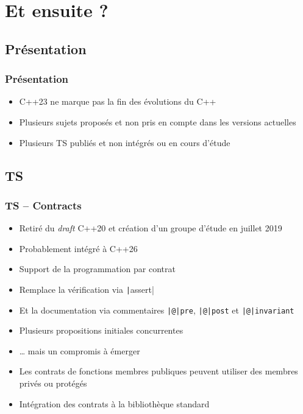 \documentclass[C++.tex]{subfiles}
\begin{document}
\section{Et ensuite ?}
\subsection*{Présentation}
\begin{frame}[fragile]
	\frametitle{Présentation}
	\begin{itemize}
		\item C++23 ne marque pas la fin des évolutions du C++
		\item Plusieurs sujets proposés et non pris en compte dans les versions actuelles
		\item Plusieurs TS publiés et non intégrés ou en cours d'étude
	\end{itemize}
\end{frame}

\subsection*{TS}
\begin{frame}[fragile]
	\frametitle{TS -- Contracts}
	\begin{itemize}
		\item Retiré du \textit{draft} C++20 et création d'un groupe d'étude en juillet 2019
		\item Probablement intégré à C++26
		\item Support de la programmation par contrat
		\item Remplace la vérification via \texttt|assert|
		\item Et la documentation via commentaires \texttt{|@|pre}, \texttt{|@|post} et \texttt{|@|invariant}
		\item Plusieurs propositions initiales concurrentes
		\item \ldots{} mais un compromis à émerger
		\item Les contrats de fonctions membres publiques peuvent utiliser des membres privés ou protégés
		\item Intégration des contrats à la bibliothèque standard
	\end{itemize}

\end{frame}
\end{document}
